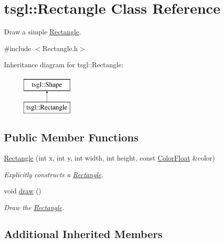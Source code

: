 \hypertarget{classtsgl_1_1_rectangle}{\section{tsgl\-:\-:Rectangle Class Reference}
\label{classtsgl_1_1_rectangle}
}


Draw a simple \hyperlink{classtsgl_1_1_rectangle}{Rectangle}.  




{\ttfamily \#include $<$Rectangle.\-h$>$}

Inheritance diagram for tsgl\-:\-:Rectangle\-:\begin{figure}[H]
\begin{center}
\leavevmode
\includegraphics[height=2.000000cm]{classtsgl_1_1_rectangle}
\end{center}
\end{figure}
\subsection*{Public Member Functions}
\begin{DoxyCompactItemize}
\item 
\hyperlink{classtsgl_1_1_rectangle_a1fb2a492ffc57b2da380ea23d89e887b}{Rectangle} (int x, int y, int width, int height, const \hyperlink{structtsgl_1_1_color_float}{Color\-Float} \&color)
\begin{DoxyCompactList}\small\item\em Explicitly constructs a \hyperlink{classtsgl_1_1_rectangle}{Rectangle}. \end{DoxyCompactList}\item 
void \hyperlink{classtsgl_1_1_rectangle_addad1e65bc50d3669e6350aa32249c7f}{draw} ()
\begin{DoxyCompactList}\small\item\em Draw the \hyperlink{classtsgl_1_1_rectangle}{Rectangle}. \end{DoxyCompactList}\end{DoxyCompactItemize}
\subsection*{Additional Inherited Members}


